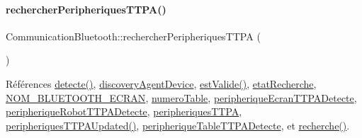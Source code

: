 \paragraph{\texorpdfstring{rechercher\+Peripheriques\+T\+T\+P\+A()}{rechercherPeripheriquesTTPA()}}
{\footnotesize\ttfamily Communication\+Bluetooth\+::rechercher\+Peripheriques\+T\+T\+PA (\begin{DoxyParamCaption}{ }\end{DoxyParamCaption})}



Références \hyperlink{class_communication_bluetooth_a27ecb0427e1d2a6c936294e8a68e511f}{detecte()}, \hyperlink{class_communication_bluetooth_a9e04dbd88ba090525d6691cc1a4237b6}{discovery\+Agent\+Device}, \hyperlink{class_communication_bluetooth_a69f544bb71f5287689ee051511811669}{est\+Valide()}, \hyperlink{class_communication_bluetooth_a9e252653d4d3c6fa9c772b35bf0eb02f}{etat\+Recherche}, \hyperlink{terminal-_t_t_p_a_2communicationbluetooth_8h_a2bd8beaaf0c4b59979a3f78d4c134ec8}{N\+O\+M\+\_\+\+B\+L\+U\+E\+T\+O\+O\+T\+H\+\_\+\+E\+C\+R\+AN}, \hyperlink{class_communication_bluetooth_a9428f8261f0cc055e9c6fed9a61cb595}{numero\+Table}, \hyperlink{class_communication_bluetooth_a2027c09adf569761c9a0500ab00f14fa}{peripherique\+Ecran\+T\+T\+P\+A\+Detecte}, \hyperlink{class_communication_bluetooth_ac4bf43e3da4748c8fa25e0ac1d3cf849}{peripherique\+Robot\+T\+T\+P\+A\+Detecte}, \hyperlink{class_communication_bluetooth_a656a80f8216d2a4db7cf2f865365e562}{peripheriques\+T\+T\+PA}, \hyperlink{class_communication_bluetooth_aab8b17e2574afe3ea0ee390a7d63c7a4}{peripheriques\+T\+T\+P\+A\+Updated()}, \hyperlink{class_communication_bluetooth_a1b4f8cfa7d15ede41c4a6f5c9521e955}{peripherique\+Table\+T\+T\+P\+A\+Detecte}, et \hyperlink{class_communication_bluetooth_a51ea5f21cc952cabc02c0a0f364b69d9}{recherche()}.


